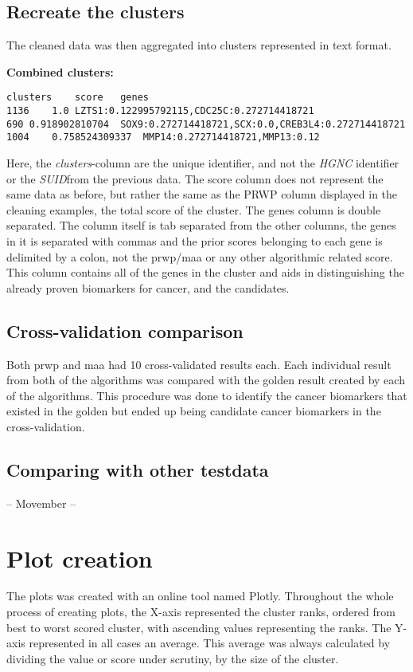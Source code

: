 \subsection{Recreate the clusters}
The cleaned data was then aggregated into clusters represented in text format.

\textbf{Combined clusters:}
\begin{verbatim}
clusters	score	genes
1136	1.0	LZTS1:0.122995792115,CDC25C:0.272714418721
690	0.918902810704	SOX9:0.272714418721,SCX:0.0,CREB3L4:0.272714418721
1004	0.758524309337	MMP14:0.272714418721,MMP13:0.12
\end{verbatim}

Here, the \textit{clusters}-column are the unique identifier, and not the
\textit{HGNC} identifier or the \textit{SUID}from the previous data. The score
column does not represent the same data as before, but rather the same as the
PRWP column displayed in the cleaning examples, the total score of the cluster.
The genes column is double separated. The column itself is tab separated from
the other columns, the genes in it is separated with commas and the prior scores
belonging to each gene is delimited by a colon, not the \gls{prwp}/\gls{maa} or
any other algorithmic related score. This column contains all of the genes in
the cluster and aids in distinguishing the already proven biomarkers for cancer,
and the candidates.

\subsection{Cross-validation comparison}
Both \gls{prwp} and \gls{maa} had 10 cross-validated results each. Each
individual result from both of the algorithms was compared with the \gls{golden}
result created by each of the algorithms. This procedure was done to identify
the cancer biomarkers that existed in the \gls{golden} but ended up being
candidate cancer biomarkers in the cross-validation.

\subsection{Comparing with other testdata}
-- Movember --

\section{Plot creation}
The plots was created with an online tool named Plotly\cite{plotly}. Throughout
the whole process of creating plots, the X-axis represented the cluster ranks,
ordered from best to worst scored cluster, with ascending values representing
the ranks. The Y-axis represented in all cases an average. This average was
always calculated by dividing the value or score under scrutiny, by the size of
the cluster.
